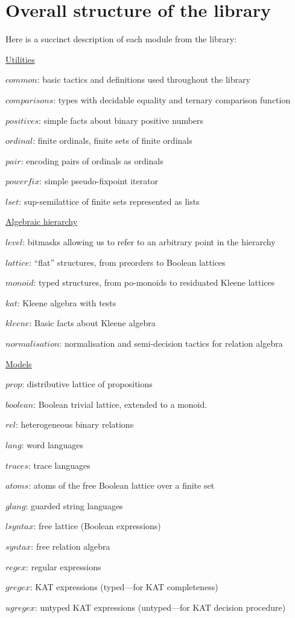 \documentclass[a4paper]{llncs}
\begin{document}
\clearpage
\section{Overall structure of the library}
\label{app:structure}

Here is a succinct description of each module from the library:

\newcommand\module[1]{\item \coqe$#1$:}
\begin{description}
  \item {}\ul{Utilities}
  \begin{description}
    \module{common} basic tactics and definitions used
    throughout the library
    \module{comparisons} types with decidable equality
    and ternary comparison function
    \module{positives} simple facts about binary positive numbers
    \module{ordinal} finite ordinals, finite sets of
    finite ordinals
    \module{pair} encoding pairs of ordinals as ordinals
    \module{powerfix} simple pseudo-fixpoint iterator
    \module{lset} sup-semilattice of finite sets represented as lists
  \end{description}
  \item {}\ul{Algebraic hierarchy}
  \begin{description}
    \module{level} bitmasks allowing us to refer to an
    arbitrary point in the hierarchy
    \module{lattice} ``flat'' structures, from preorders
    to Boolean lattices
    \module{monoid} typed structures, from po-monoids to residuated Kleene lattices
    \module{kat} Kleene algebra with tests
    \module{kleene} Basic facts about Kleene algebra
    \module{normalisation} normalisation and semi-decision tactics for relation algebra
  \end{description}
  \item {}\ul{Models}
    \begin{description}
    \module{prop} distributive lattice of propositions
    \module{boolean} Boolean trivial lattice, extended to a monoid.
    \module{rel} heterogeneous binary relations
    \module{lang} word languages
    \module{traces} trace languages
    \module{atoms} atoms of the free Boolean lattice over a finite set
    \module{glang} guarded string languages
    \module{lsyntax} free lattice (Boolean expressions)
    \module{syntax} free relation algebra
    \module{regex} regular expressions
    \module{gregex} KAT expressions (typed---for KAT completeness)
    \module{ugregex} untyped KAT expressions (untyped---for KAT decision procedure)

\end{description}
\end{description}
\end{document}
